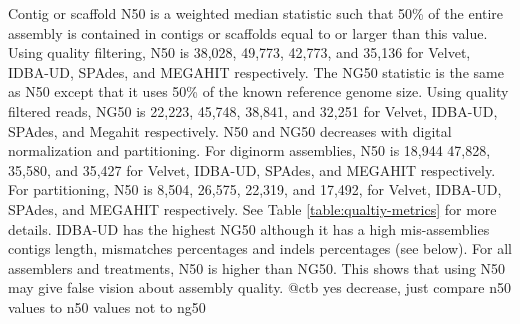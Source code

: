 

Contig or scaffold N50 is a weighted median statistic such that 50\% of the entire assembly is contained in contigs or scaffolds equal to or larger than this value. Using quality filtering, N50 is 38,028, 49,773,  42,773, and 35,136 for Velvet, IDBA-UD, SPAdes, and MEGAHIT respectively. The NG50 statistic is the same as N50 except that it uses 50\% of the known reference genome size. Using quality filtered reads,  NG50 is 22,223, 45,748, 38,841, and 32,251 for Velvet, IDBA-UD, SPAdes, and Megahit respectively.  N50 and NG50 decreases with digital normalization and partitioning. For diginorm assemblies, N50 is 18,944 47,828, 35,580, and 35,427 for Velvet, IDBA-UD, SPAdes, and MEGAHIT respectively.  For partitioning, N50 is 8,504, 26,575, 22,319, and 17,492, for Velvet, IDBA-UD, SPAdes, and MEGAHIT respectively.  See Table \ref{table:qualtiy-metrics} for more details. 
IDBA-UD has the highest NG50 although it has a high mis-assemblies contigs length, mismatches percentages and indels percentages (see below). For all assemblers and treatments, N50 is higher than NG50. This shows that using N50 may give false vision about assembly quality.  %
@ctb yes decrease, just compare n50 values to n50  values not to ng50 






